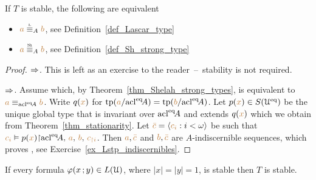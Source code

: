 \begin{corollary}\label{corol_Ltype_Shtype}
  If $T$ is stable, the following are equivalent\smallskip
  \begin{itemize}
  \item[1.] ${\mr a}\equivL_A{\mr b}$, see Definition~\ref{def_Lascar_type}\smallskip
  \item[2.] ${\mr a}\equivSh_A{\mr b}$, see Definition~\ref{def_Sh_strong_type}\smallskip
  \end{itemize}
  \end{corollary}
  \begin{proof}$\Rightarrow$.
    This is left as an exercise to the reader~--~stability is not required.
  
    $\Rightarrow$.
    Assume  which, by Theorem~\ref{thm_Shelah_strong_types}, is equivalent to ${\color{brown} a}\equiv_{{\rm acl}^{{\rm eq}}\!A}{\color{brown} b}$.
    Write $q({\color{brown} x})$ for ${\rm tp}({\color{brown} a}/{{\rm acl}}^{{\rm eq}}\!A)={\rm tp}({\color{brown} b}/{{\rm acl}}^{{\rm eq}}\!A)$. Let $p({\color{brown} x})\in S(\EuScript U^{{\rm eq}})$ be the unique global type that is invariant over ${\rm acl}^{{\rm eq}}\!A$ and extends $q({\color{brown} x})$ which we obtain from Theorem~\ref{thm_stationarity}.
    Let ${\color{brown}\bar c}=\langle{\color{brown}c_i}:i<\omega\rangle$ be such that ${\color{brown} c_i}\vDash p({\color{brown} x}){\restriction}{\rm acl}^{{\rm eq}}\!A,\,{\color{brown} a},\,{\color{brown} b},\,{\color{brown} c_{\restriction i}}$.
    Then ${\color{brown} a},{\color{brown}\bar c}$ and ${\color{brown} b},{\color{brown}\bar c}$ are $A$-indiscernible sequences, which proves , see Exercise~\ref{ex_Lstp_indiscernibles}.
  \end{proof}
  

\def\medrel#1{\parbox[t]{6ex}{$\displaystyle\hfil #1$}}
\def\ceq#1#2#3{\parbox[t]{15ex}{$\displaystyle #1$}\medrel{#2}$\displaystyle  #3$}

\begin{theorem}
  If every formula $\varphi(x\,;y)\in L(\EuScript U)$, where $|x|=|y|=1$, is stable then $T$ is stable.
\end{theorem}

